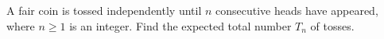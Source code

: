 A fair coin is tossed independently until $n$ consecutive heads have appeared, where $n\ge1$ is an integer. Find the expected total number $T_n$ of tosses.
